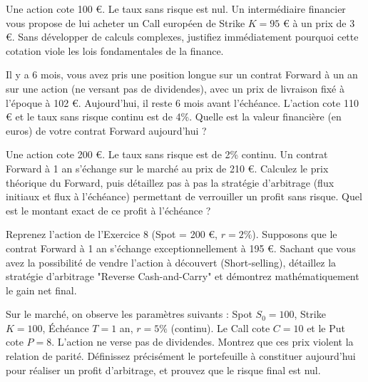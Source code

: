 \begin{exercicebox}
Une action cote 100 €. Le taux sans risque est nul. Un intermédiaire financier vous propose de lui acheter un Call européen de Strike $K = 95$ € à un prix de 3 €.
Sans développer de calculs complexes, justifiez immédiatement pourquoi cette cotation viole les lois fondamentales de la finance.
\end{exercicebox}

\begin{exercicebox}
Il y a 6 mois, vous avez pris une position longue sur un contrat Forward à un an sur une action (ne versant pas de dividendes), avec un prix de livraison fixé à l'époque à 102 €. 
Aujourd'hui, il reste 6 mois avant l'échéance. L'action cote 110 € et le taux sans risque continu est de 4\%. 
Quelle est la valeur financière (en euros) de votre contrat Forward aujourd'hui ?
\end{exercicebox}

\begin{exercicebox}
Une action cote 200 €. Le taux sans risque est de 2\% continu. Un contrat Forward à 1 an s'échange sur le marché au prix de 210 €.
Calculez le prix théorique du Forward, puis détaillez pas à pas la stratégie d'arbitrage (flux initiaux et flux à l'échéance) permettant de verrouiller un profit sans risque. Quel est le montant exact de ce profit à l'échéance ?
\end{exercicebox}

\begin{exercicebox}
Reprenez l'action de l'Exercice 8 (Spot = 200 €, $r=2\%$). Supposons que le contrat Forward à 1 an s'échange exceptionnellement à 195 €.
Sachant que vous avez la possibilité de vendre l'action à découvert (Short-selling), détaillez la stratégie d'arbitrage "Reverse Cash-and-Carry" et démontrez mathématiquement le gain net final.
\end{exercicebox}

\begin{exercicebox}
Sur le marché, on observe les paramètres suivants : Spot $S_0 = 100$, Strike $K = 100$, Échéance $T = 1$ an, $r = 5\%$ (continu). Le Call cote $C = 10$ et le Put cote $P = 8$. L'action ne verse pas de dividendes.
Montrez que ces prix violent la relation de parité. Définissez précisément le portefeuille à constituer aujourd'hui pour réaliser un profit d'arbitrage, et prouvez que le risque final est nul.
\end{exercicebox}

